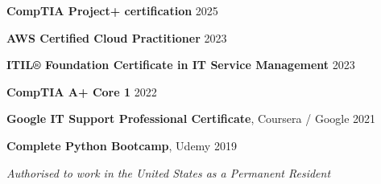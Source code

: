 \documentclass[11pt,letterpaper]{article}
\newcommand{\normalsizesection}{\normalsize}
\begin{document}
\noindent\textbf{CompTIA Project+ certification} \hfill 2025

\vspace{-1pt}
\noindent\textbf{AWS Certified Cloud Practitioner} \hfill 2023

\vspace{-1pt}
\noindent\textbf{ITIL® Foundation Certificate in IT Service Management} \hfill 2023

\vspace{-1pt}
\noindent\textbf{CompTIA A+ Core 1} \hfill 2022

\vspace{-1pt}
\noindent\textbf{Google IT Support Professional Certificate}, Coursera / Google \hfill 2021

\vspace{-1pt}
\noindent\textbf{Complete Python Bootcamp}, Udemy \hfill 2019

\normalsizesection

\vspace{3pt}
\begin{center}
\textit{Authorised to work in the United States as a Permanent Resident}
\end{center}
\end{document}
